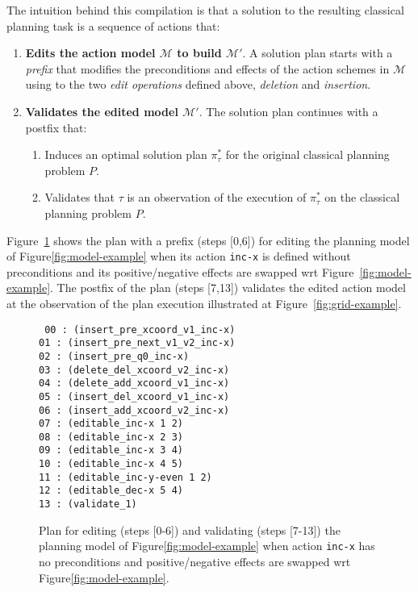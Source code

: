 \documentclass[letterpaper]{article} %
\begin{document}
The intuition behind this compilation is that a solution to the resulting classical planning task is a sequence of actions that:
\begin{enumerate}
\item {\bf Edits the action model $\mathcal{M}$ to build $\mathcal{M}'$}. A solution plan starts with a {\em prefix} that modifies the preconditions and effects of the action schemes in $\mathcal{M}$ using to the two {\em edit operations} defined above, {\em deletion} and {\em insertion}. 
\item {\bf Validates the edited model $\mathcal{M}'$}. The solution plan continues with a postfix that:
\begin{enumerate}
\item Induces an optimal solution plan $\pi^*_\tau$ for the original classical planning problem $P$.
\item Validates that $\tau$ is an observation of the execution of $\pi^*_\tau$ on the classical planning problem $P$.
\end{enumerate}
\end{enumerate}

Figure~\ref{fig:plan-pdistance} shows the plan with a prefix (steps [0,6]) for editing the planning model of Figure\ref{fig:model-example} when its action {\tt\small inc-x} is defined without preconditions and its positive/negative effects are swapped wrt Figure~\ref{fig:model-example}. The postfix of the plan (steps [7,13]) validates the edited action model at the observation of the plan execution illustrated at Figure~\ref{fig:grid-example}. 
\begin{figure}
{\tt\scriptsize
00 : (insert\_pre\_xcoord\_v1\_inc-x)\\
01 : (insert\_pre\_next\_v1\_v2\_inc-x)\\
02 : (insert\_pre\_q0\_inc-x)\\
03 : (delete\_del\_xcoord\_v2\_inc-x)\\
04 : (delete\_add\_xcoord\_v1\_inc-x)\\
05 : (insert\_del\_xcoord\_v1\_inc-x)\\
06 : (insert\_add\_xcoord\_v2\_inc-x)\\
07 : (editable\_inc-x 1 2)\\
08 : (editable\_inc-x 2 3)\\
09 : (editable\_inc-x 3 4)\\
10 : (editable\_inc-x 4 5)\\
11 : (editable\_inc-y-even 1 2)\\
12 : (editable\_dec-x 5 4)\\
13 : (validate\_1)
}
 \caption{\small Plan for editing (steps [0-6]) and validating (steps [7-13]) the planning model of Figure\ref{fig:model-example} when action {\tt\small inc-x} has no preconditions and positive/negative effects are swapped wrt Figure\ref{fig:model-example}.}
\label{fig:plan-pdistance}
\end{figure}
\end{document}
